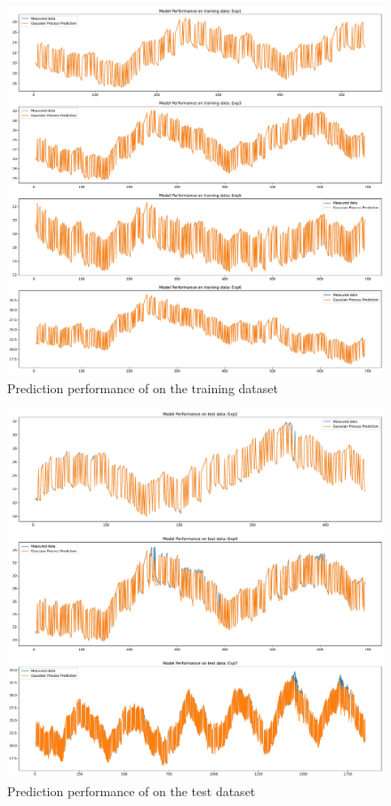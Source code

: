 \begin{figure}[ht]
    \centering
    \includegraphics[width = \textwidth]{Plots/GP_213_training_performance.pdf}
    \caption{Prediction performance of  on the training dataset}
    \label{fig:GP_213_train_validation}
\end{figure}

\begin{figure}[ht]
    \centering
    \includegraphics[width = \textwidth]{Plots/GP_213_test_performance.pdf}
    \caption{Prediction performance of  on the test dataset}
    \label{fig:GP_213_test_validation}
\end{figure}

